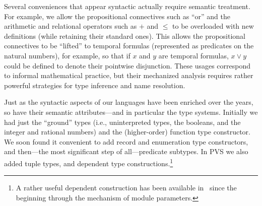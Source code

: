 
Several conveniences that appear syntactic actually require semantic
treatment.  For example, we allow the propositional connectives such
as ``or'' and the arithmetic and relational operators such as $+$ and
$ \leq $ to be overloaded with new definitions (while retaining their
standard ones).  This allows the propositional connectives to be
``lifted'' to temporal formulas (represented as predicates on the
natural numbers), for example, so that if $x$ and $y$ are temporal
formulas, $x \vee y$ could be defined to denote their pointwise
disjunction.  These usages correspond to informal mathematical
practice, but their mechanized analysis requires rather powerful
strategies for type inference and name resolution.

Just as the syntactic aspects of our languages have been enriched
over the years, so have their semantic attributes---and in particular
the type systems.  Initially we had just the ``ground'' types (i.e.,
uninterpreted types, the booleans, and the integer and rational
numbers) and the (higher-order) function type constructor.  We soon
found it convenient to add record and enumeration type constructors,
and then---the most significant step of all---predicate subtypes.  In
PVS we also added tuple types, and dependent type
constructions.\footnote{A rather useful dependent construction has
been available in \ehdm\ since the beginning through the mechanism of
module parameters.}

